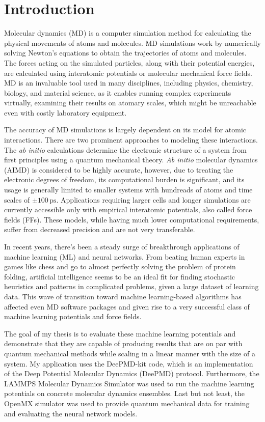 \chapter{Introduction}

Molecular dynamics (MD) is a computer simulation method for calculating the
physical movements of atoms and molecules. MD simulations work by numerically
solving Newton's equations to obtain the trajectories of atoms and molecules.
The forces acting on the simulated particles, along with their potential
energies, are calculated using interatomic potentials or molecular mechanical
force fields. MD is an invaluable tool used in many disciplines, including
physics, chemistry, biology, and material science, as it enables running
complex experiments virtually, examining their results on atomary scales,
which might be unreachable even with costly laboratory equipment.

The accuracy of MD simulations is largely dependent on its model for atomic
interactions. There are two prominent approaches to modeling these
interactions. The \textit{ab initio} calculations determine the electronic
structure of a system from first principles using a quantum mechanical theory.
\textit{Ab initio} molecular dynamics (AIMD) is considered to be highly
accurate, however, due to treating the electronic degrees of freedom, its
computational burden is significant, and its usage is generally limited to
smaller systems with hundreads of atoms and time scales of
$\pm 100 \, \mathrm{ps}$. Applications requiring larger cells and longer
simulations are currently accessible only with empirical interatomic
potentials, also called force fields (FFs). These models, while having much
lower computational requirements, suffer from decreased precision and
are not very transferable.

In recent years, there's been a steady surge of breakthrough applications of
machine learning (ML) and neural networks. From beating human experts in
games like chess and go to almost perfectly solving the problem of protein
folding, artificial intelligence seems to be an ideal fit for finding
stochastic heuristics and patterns in complicated problems, given a large
dataset of learning data. This wave of transition toward machine
learning-based algorithms has affected even MD software packages and given
rise to a very successful class of machine learning potentials and force
fields.

The goal of my thesis is to evaluate these machine learning potentials and
demonstrate that they are capable of producing results that are on par with
quantum mechanical methods while scaling in a linear manner with the size of a
system. My application uses the DeePMD-kit code, which is an implementation of
the Deep Potential Molecular Dynamics (DeePMD) protocol. Furthermore, the
LAMMPS Molecular Dynamics Simulator was used to run the machine learning
potentials on concrete molecular dynamics ensembles. Last but not least, the
OpenMX simulator was used to provide quantum mechanical data for training and
evaluating the neural network models.

%
%
